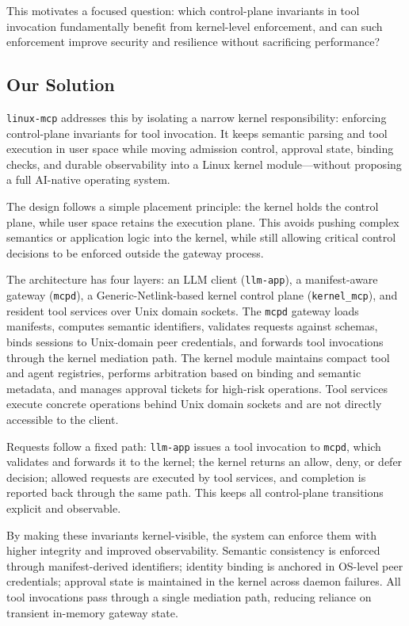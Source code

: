 This motivates a focused question: which control-plane invariants in tool invocation fundamentally benefit from kernel-level enforcement, and can such enforcement improve security and resilience without sacrificing performance?

\subsection{Our Solution}

\texttt{linux-mcp} addresses this by isolating a narrow kernel responsibility: enforcing control-plane invariants for tool invocation.
It keeps semantic parsing and tool execution in user space while moving admission control, approval state, binding checks, and durable observability into a Linux kernel module---without proposing a full AI-native operating system.

The design follows a simple placement principle: the kernel holds the control plane, while user space retains the execution plane. 
This avoids pushing complex semantics or application logic into the kernel, while still allowing critical control decisions to be enforced outside the gateway process.

The architecture has four layers: an LLM client (\texttt{llm-app}), a manifest-aware gateway (\texttt{mcpd}), a Generic-Netlink-based kernel control plane (\texttt{kernel\_mcp}), and resident tool services over Unix domain sockets. 
The \texttt{mcpd} gateway loads manifests, computes semantic identifiers, validates requests against schemas, binds sessions to Unix-domain peer credentials, and forwards tool invocations through the kernel mediation path. 
The kernel module maintains compact tool and agent registries, performs arbitration based on binding and semantic metadata, and manages approval tickets for high-risk operations. 
Tool services execute concrete operations behind Unix domain sockets and are not directly accessible to the client.

Requests follow a fixed path: \texttt{llm-app} issues a tool invocation to \texttt{mcpd}, which validates and forwards it to the kernel; the kernel returns an allow, deny, or defer decision; allowed requests are executed by tool services, and completion is reported back through the same path. 
This keeps all control-plane transitions explicit and observable.

By making these invariants kernel-visible, the system can enforce them with higher integrity and improved observability.
Semantic consistency is enforced through manifest-derived identifiers; identity binding is anchored in OS-level peer credentials; approval state is maintained in the kernel across daemon failures.
All tool invocations pass through a single mediation path, reducing reliance on transient in-memory gateway state.


